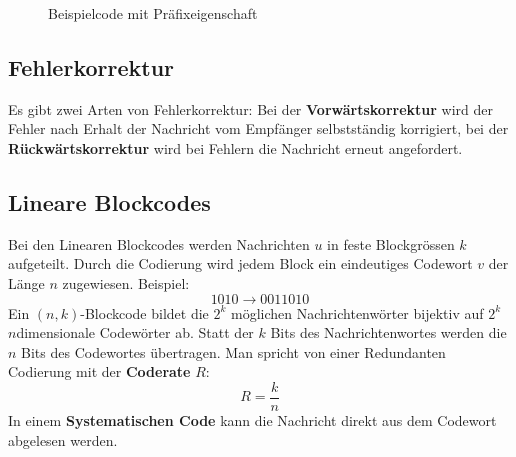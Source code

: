 \begin{figure}[H]
	\caption{Beispielcode mit Präfixeigenschaft}
\end{figure}


\subsection{Fehlerkorrektur}

Es gibt zwei Arten von Fehlerkorrektur: Bei der \textbf{Vorwärtskorrektur} wird
der Fehler nach Erhalt der Nachricht vom Empfänger selbstständig korrigiert, bei
der \textbf{Rückwärtskorrektur} wird bei Fehlern die Nachricht erneut
angefordert.


\subsection{Lineare Blockcodes}

Bei den Linearen Blockcodes werden Nachrichten $u$ in feste Blockgrössen $k$
aufgeteilt. Durch die Codierung wird jedem Block ein eindeutiges Codewort $v$
der Länge $n$ zugewiesen.
Beispiel:
\[
	1010 \rightarrow 0011010
\]
Ein $(n,k)$-Blockcode bildet die $2^k$ möglichen Nachrichtenwörter bijektiv auf
$2^k$ $n$dimensionale Codewörter ab. Statt der $k$ Bits des Nachrichtenwortes
werden die $n$ Bits des Codewortes übertragen. Man spricht von einer Redundanten
Codierung mit der \textbf{Coderate} $R$:
\[
	R = \frac{k}{n}
\]
In einem \textbf{Systematischen Code} kann die Nachricht direkt aus dem Codewort
abgelesen werden.

